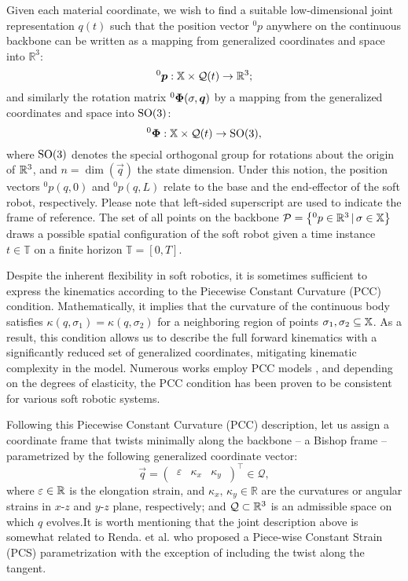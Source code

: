 {Given each material coordinate, we wish to find a suitable low-dimensional joint representation $q(t)$ such that the position vector $^0p$ anywhere on the continuous backbone can be written as a mapping from generalized coordinates and space into $\mathbb{R}^3$:
%
\begin{equation}
^0\boldsymbol{p}:  \mathbb{X} \times \mathcal{Q}(t) \to \mathbb{R}^3;
\end{equation}
%
and similarly the rotation matrix $^0\boldsymbol{\Phi}(\sigma,\boldsymbol{q})$ by a mapping from the generalized coordinates and space into ${\text{SO}(3)}$:
%
\begin{equation}
^0\mat{\Phi}: \Xs \times \mathcal{Q}(t) \to \SO{3}, \label{eq:phi_map}
\end{equation}
%
where {${\text{SO}(3)}$ denotes the special orthogonal group for rotations about the origin of $\mathbb{R}^3$}, and $n = \dim(\vec{q})$ the state dimension. Under this notion, the position vectors $^0p(q,0)$ and {$^0p(q,L)$} relate to the base and the end-effector of the soft robot, respectively. {Please note that left-sided superscript are used to indicate the frame of reference.} The set of all points on the backbone $\mathcal{P} = \left\{^0p \in \mathbb{R}^3\, |\, \sigma \in \mathbb{X} \right\}$ draws a possible {spatial} configuration of the soft robot given {a time instance $t \in \mathbb{T}$ on a finite horizon $\mathbb{T} = [0,T]$}.
%
\begin{intermezzo}
Despite the inherent flexibility in soft robotics, it is sometimes sufficient to express the kinematics according to the Piecewise Constant Curvature (PCC) condition. Mathematically, it implies that the curvature of the continuous body satisfies $\kappa(q,\sigma_1) = \kappa(q,\sigma_2)$ for a neighboring region of points $\sigma_1,\sigma_2 \subseteq \mathbb{X}$. As a result, this condition allows us to describe the full forward kinematics with a significantly reduced set of generalized coordinates, mitigating kinematic complexity in the model. Numerous works employ PCC models \cite{Falkenhahn2015,Katzschmann2019,Tatlicioglu2007,Marchese2016,Godage2016,Santina2020Pcc}, and depending on the degrees of elasticity, the PCC condition has been proven to be consistent for various soft robotic systems.
\end{intermezzo}
%
{Following this Piecewise Constant Curvature (PCC) description, let us assign a coordinate frame that twists minimally along the backbone -- a Bishop frame \cite{Bishop1975}-- parametrized by the following generalized coordinate vector:}
%
\begin{equation}
\vec{q} = \begin{pmatrix}
\,\varepsilon & \kappa_x & \kappa_y\,
\end{pmatrix}^\top \in \mathcal{Q},
\label{eq:coordinate}
\end{equation}
%
\noindent where {$\varepsilon \in \mathbb{R}$ is the elongation strain}, and $\kappa_x,\,\kappa_y\in\mathbb{R}$ are the curvatures or angular strains in $x$-$z$ and $y$-$z$ plane, respectively; and $\mathcal{Q} \subset \mathbb{R}^3$ is an admissible space on which $q$ evolves.It is worth mentioning that the joint description above is somewhat related to Renda. et al. \cite{Renda2018} who proposed a Piece-wise Constant Strain (PCS) parametrization with the exception of including the twist along the tangent.

}
